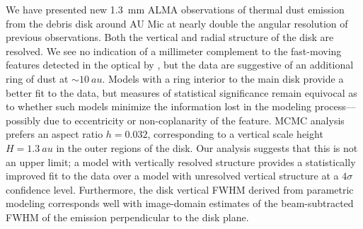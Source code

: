 \documentclass[modern]{aastex62}
\begin{document}
We have presented new \SI{1.3}{mm} ALMA observations of thermal dust
emission from the debris disk around AU Mic at
nearly double the angular resolution of previous observations. 
Both the vertical and radial structure of the disk are resolved.
We see no indication of a millimeter complement to the fast-moving features detected in the optical by \citet{boccaletti15}, but the data are suggestive of an additional ring of dust at $\sim \SI{10}{au}$.
Models with a ring interior to the main disk provide a better fit to the data, but measures of statistical significance remain equivocal as to whether such models
minimize the information lost in the modeling process---possibly due to eccentricity or non-coplanarity of the feature.
MCMC analysis prefers an aspect ratio $h = 0.032$, corresponding to a vertical scale height $H = \SI{1.3}{au}$ in the outer regions of the disk.
Our analysis suggests that this is not an upper limit; a model with vertically resolved structure provides a statistically improved fit to the data over a model with unresolved vertical structure at a $4 \sigma$ confidence level.
Furthermore, the disk vertical FWHM derived from parametric modeling corresponds well with image-domain estimates of the beam-subtracted FWHM of the emission perpendicular to the disk plane.
\end{document}
